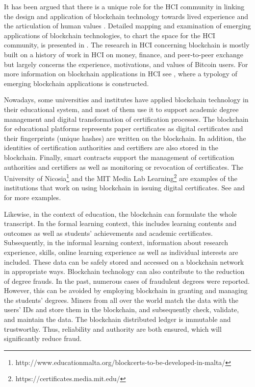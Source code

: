 \documentclass[manuscript,review,anonymous]{acmart}%
\begin{document}
It has been argued that there is a unique role for the HCI community in linking the design and application of blockchain technology towards lived
experience and the articulation of human values \cite{els}. Detailed mapping and examination of
emerging applications of blockchain technologies, to chart the space for the HCI community, is presented in \cite{els}.
The research in HCI concerning blockchain is mostly built on a history of
work in HCI on money, finance, and peer-to-peer exchange \cite{bel, car, fer, kay,lam, mil,shi} but largely concerns the
experience, motivations, and values of Bitcoin users. For more information on blockchain applications in HCI see \cite{els}, where a typology of emerging blockchain applications is constructed.



Nowadays, some universities and institutes have applied blockchain technology in their educational system, and most of them use it to support academic degree management and digital transformation of certification processes. The blockchain for educational platforms represents paper certificates as digital certificates and their fingerprints (unique hashes) are written on the blockchain. In addition, the identities of certification authorities and certifiers are also stored in the blockchain. Finally, smart contracts support the management of certification authorities and certifiers as well as monitoring or revocation of certificates.
The University of Nicosia\footnote{http://www.educationmalta.org/blockcerts-to-be-developed-in-malta/} and the MIT Media Lab Learning\footnote{https://certificates.media.mit.edu/} are examples of the institutions that work on using blockchain in issuing digital certificates.
See \cite{chen} and \cite{gra} for more examples.


Likewise, in the context of education, the blockchain can formulate the whole transcript. In the formal learning context, this includes learning contents and outcomes as well as students' achievements and academic certificates. Subsequently, in the informal learning context, information about research experience, skills, online learning experience as well as individual interests are included. These data can be safely stored and accessed on a blockchain network in appropriate ways.
Blockchain technology can also contribute to the reduction of degree frauds. In the past, numerous cases of fraudulent degrees were reported. However, this can be avoided by employing blockchain in granting and managing the students' degrees. Miners from all over the world match the data with the users' IDs and store them in the blockchain, and subsequently check, validate, and maintain the data. The blockchain distributed ledger is immutable and trustworthy. Thus, reliability and authority are both ensured, which will significantly reduce fraud.
\end{document}
